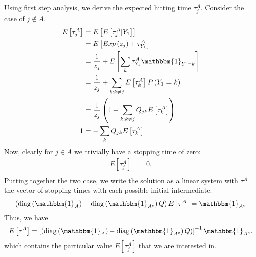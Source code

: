 Using first step analysis, we derive the expected hitting time $\tau_j^A$. Consider the case of $j \not\in A$.
\begin{align}
	E\left[\tau^{A}_{j}\right] &= E\left[E\left[\tau^{A}_{j} | Y_1 \right]\right] \\
        &= E\left[ Exp\left(z_j\right) + \tau^{A}_{Y_1} \right] \\
        &=  \frac{1}{z_j} + E\left[\sum_{k}\tau^{A}_{Y_1}\mathbbm{1}_{Y_1 = k}\right] \\
        &=  \frac{1}{z_j} + \sum_{k: k\neq j}E\left[\tau^{A}_{k}\right] P\left(Y_1 = k\right) \\
        &=  \frac{1}{z_j}\left(1 + \sum_{k: k\neq j}Q_{jk}E\left[\tau^{A}_{k}\right]\right)     \\
  1 &=  -\sum_{k}Q_{jk}E\left[\tau^{A}_{k}\right]  \\
\end{align}
Now, clearly for $j \in A$ we trivially have a stopping time of zero:
\begin{align}
	E\left[\tau^{A}_{j}\right] &= 0. \\
\end{align}
Putting together the two case, we write the solution as a linear system with $\tau^A$ the vector of stopping times with each possible initial intermediate.
\begin{align}
	\left(\diag\left(\mathbbm{1}_A\right) - \diag\left(\mathbbm{1}_{A^c}\right)Q\right)E\left[\tau^{A}\right] =\mathbbm{1}_{A^c}\\
\end{align}
Thus, we have
\begin{align}
	E\left[\tau^{A}\right] = \left[\left(\diag\left(\mathbbm{1}_A\right) - \diag\left(\mathbbm{1}_{A^c}\right)Q\right)\right]^{-1} \mathbbm{1}_{A^c}.\\
\end{align}
which contains the particular value $E[\tau^A_j]$ that we are interested in.
 
